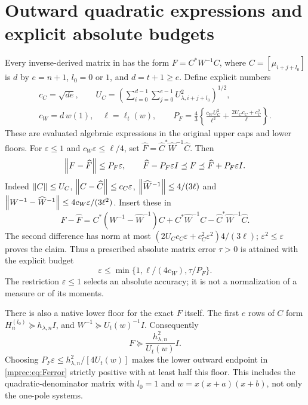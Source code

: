\section{Outward quadratic expressions and explicit absolute budgets}

Every inverse-derived matrix in \cite{mprec:FM} has the form
$F=C^*W^{-1}C$, where $C=[\mu_{i+j+l_0}]$ is $d$ by $e=n+1$,
$l_0=0$ or $1$, and $d=t+1\ge e$. Define explicit numbers
\begin{equation}\label{mprec:eq:P}
 \begin{gathered}
 c_C=\sqrt{de},\qquad
 U_C=\left(\sum_{i=0}^{d-1}\sum_{j=0}^{e-1}
                     U_{\lambda,i+j+l_0}^{2}\right)^{1/2},\\
 c_W=d\,w(1),\quad \ell=\ell_t(w),\qquad
 P_F=\frac43\left\{\frac{c_WU_C^2}{\ell^2}
                  +\frac{2U_Cc_C+c_C^2}{\ell}\right\}.
 \end{gathered}
\end{equation}
These are evaluated algebraic expressions in the original upper
caps and lower floors. For $\varepsilon\le1$ and
$c_W\varepsilon\le\ell/4$, set
$\widehat F=\widehat C^*\widehat W^{-1}\widehat C$.
Then
\begin{equation}\label{mprec:eq:Ferror}
 \left\lVert F-\widehat F\right\rVert\le P_F\varepsilon,
 \qquad \widehat F-P_F\varepsilon I\preceq F
 \preceq\widehat F+P_F\varepsilon I.
\end{equation}
Indeed $\left\lVert C\right\rVert\le U_C$, $\left\lVert C-\widehat C\right\rVert\le c_C\varepsilon$,
$\left\lVert\widehat W^{-1}\right\rVert\le4/(3\ell)$ and
$\left\lVert W^{-1}-\widehat W^{-1}\right\rVert\le4c_W\varepsilon/(3\ell^2)$.
Insert these in
\[
 F-\widehat F=C^*(W^{-1}-\widehat W^{-1})C
              +C^*\widehat W^{-1}C-
                    \widehat C^*\widehat W^{-1}\widehat C.
\]
The second difference has norm at most
$(2U_Cc_C\varepsilon+c_C^2\varepsilon^2)4/(3\ell)$;
$\varepsilon^2\le\varepsilon$ proves the claim. Thus a prescribed
absolute matrix error $\tau>0$ is attained with the explicit budget
\begin{equation}\label{mprec:eq:budgetF}
 \varepsilon\le\min\{1,\ell/(4c_W),\tau/P_F\}.
\end{equation}
The restriction $\varepsilon\le1$ selects an absolute accuracy;
it is not a normalization of a measure or of its moments.

There is also a native lower floor for the exact $F$ itself. The
first $e$ rows of $C$ form $H_n^{(l_0)}\succeq h_{\lambda,n}I$,
and $W^{-1}\succeq U_t(w)^{-1}I$. Consequently
\begin{equation}\label{mprec:eq:Ffloor}
 F\succeq\frac{h_{\lambda,n}^2}{U_t(w)}I.
\end{equation}
Choosing $P_F\varepsilon\le h_{\lambda,n}^2/[4U_t(w)]$
makes the lower outward endpoint in \eqref{mprec:eq:Ferror} strictly
positive with at least half this floor. This includes the
quadratic-denominator matrix with $l_0=1$ and
$w=x(x+a)(x+b)$, not only the one-pole systems.

